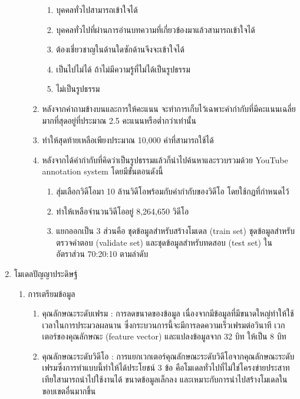 \begin{enumerate}
\begin{enumerate}
\begin{enumerate}
\begin{enumerate}
				\setlength\itemsep{-0.25em}
				\item บุคคลทั่วไปสามารถเข้าใจได้
				\item บุคคลทั่วไปที่ผ่านการอ่านบทความที่เกี่ยวข้องมาแล้วสามารถเข้าใจได้
				\item ต้องเชี่ยวชาญในด้านใดซักด้านจึงจะเข้าใจได้
				\item เป็นไปไม่ได้ ถ้าไม่มีความรู้ที่ไม่ได้เป็นรูปธรรม
				\item ไม่เป็นรูปธรรม
			\end{enumerate}
			\item หลังจากคำถามข้างบนและการให้คะแนน จะทำการเก็บไว้เฉพาะคำกำกับที่มีคะแนนเฉลี่ยมากที่สุดอยู่ที่ประมาณ 2.5 คะแนนหรือต่ำกว่าเท่านั้น
			\item ทำให้สุดท้ายเหลือเพียงประมาณ 10,000 คำที่สามารถใช้ได้
			\item หลังจากได้คำกำกับที่คิดว่าเป็นรูปธรรมแล้วก็นำไปค้นหาและรวบรวมด้วย YouTube annotation system โดยมีขั้นตอนดังนี้										
			\begin{enumerate}
				\setlength\itemsep{-0.25em}
				\item สุ่มเลือกวิดีโอมา 10 ล้านวิดีโอพร้อมกับคำกำกับของวิดีโอ โดยใช้กฏที่กำหนดไว้
				\item ทำให้เหลือจำนวนวิดีโออยู่ 8,264,650 วิดีโอ
				\item แยกออกเป็น 3 ส่วนคือ ชุดข้อมูลสำหรับสร้างโมเดล (train set) ชุดข้อมูลสำหรับตรวจคำตอบ (validate set) และชุดข้อมูลสำหรับทดสอบ (test set) ในอัตราส่วน 70:20:10 ตามลำดับ
			\end{enumerate}
		\end{enumerate}
	\end{enumerate}
	\item {โมเดลปัญญาประดิษฐ์}
	\begin{enumerate}
		\setlength\itemsep{-0.25em}
		\item การเตรียมข้อมูล
			\begin{enumerate}  
				\item คุณลักษณะระดับเฟรม : การลดขนาดของข้อมูล เนื่องจากมีข้อมูลที่มีขนาดใหญ่ทำให้ใช้เวลาในการประมวลผลนาน ซึ่งกระบวนการนี้จะมีการลดความเร็วเฟรมต่อวินาที 
				เวกเตอร์ของคุณลักษณะ (feature vector) และแปลงข้อมูลจาก 32 บิท ให้เป็น 8 บิท
				\item คุณลักษณะระดับวิดีโอ : การแยกเวกเตอร์คุณลักษณะระดับวิดีโอจากคุณลักษณะระดับเฟรมซึ่งการทำแบบนี้ทำให้ได้ประโยชน์ 3 ข้อ 
				คือโมเดลทั่วไปที่ไม่ใช่โครงข่ายประสาทเทียใสามารถนำไปใช้งานได้ ขนาดข้อมูลเล็กลง และเหมาะกับการนำไปสร้างโมเดลในขอบเขตอื่นมากขึ้น
			\end{enumerate}	

\end{enumerate}
\end{enumerate}

